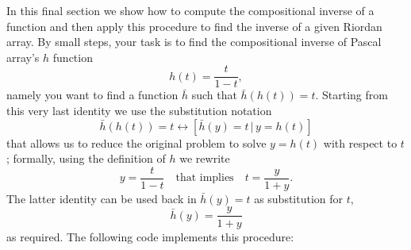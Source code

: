 In this final section we show how to compute the compositional inverse of a
function and then apply this procedure to find the inverse of a given Riordan
array. By small steps, your task is to find the compositional inverse of
Pascal array's $h$ function
\begin{displaymath}
h(t)= \frac{t}{1-t},
\end{displaymath}
namely you want to find a function $\bar{h}$ such that $\bar{h}(h(t))=t$.
Starting from this very last identity we use the substitution notation
\begin{displaymath}
\bar{h}(h(t)) = t \leftrightarrow \left[ \bar{h}(y) = t\, | \, y = h(t) \right]
\end{displaymath}
that allows us to reduce the original problem to solve $y = h(t)$ with respect
to $t$; formally, using the definition of $h$ we rewrite
\begin{displaymath}
y = \frac{t}{1-t} \quad\text{that implies}\quad t = \frac{y}{1+y}.
\end{displaymath}
The latter identity can be used back in $\bar{h}(y) = t$ as substitution for $t$,
\begin{displaymath}
\bar{h}(y)= \frac{y}{1+y}
\end{displaymath}
as required. The following code implements this procedure:



